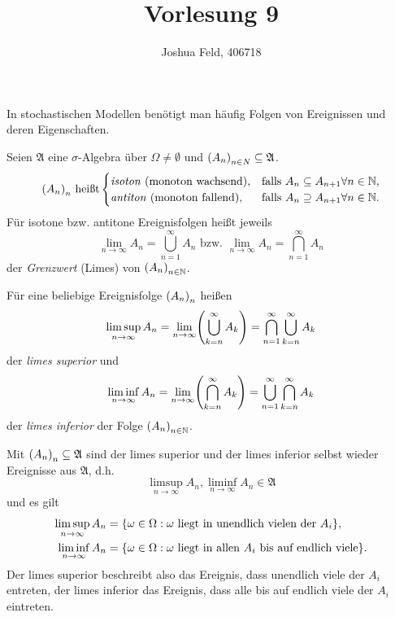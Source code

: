 \documentclass{lecture}
\institute{Institut für Statistik und Wirtschaftsmathematik}
\title{Vorlesung 9}
\author{Joshua Feld, 406718}
\begin{document}
    \maketitle


    In stochastischen Modellen benötigt man häufig Folgen von Ereignissen und deren Eigenschaften.

    \begin{definition}
        Seien \(\mathfrak{A}\) eine \(\sigma\)-Algebra über \(\Omega \ne \emptyset\) und \(\parentheses*{A_n}_{n \in N} \subseteq \mathfrak{A}\).
        \[
            \parentheses*{A_n}_n\text{ heißt}\begin{cases}
                \text{\emph{isoton} (monoton wachsend)}, & \text{falls }A_n \subseteq A_{n + 1} \forall n \in \N,\\
                \text{\emph{antiton} (monoton fallend)}, & \text{falls }A_n \supseteq A_{n + 1} \forall n \in \N.
            \end{cases}
        \]
        Für isotone bzw. antitone Ereignisfolgen heißt jeweils
        \[
            \lim_{n \to \infty}A_n = \bigcup_{n = 1}^\infty A_n\text{ bzw. }\lim_{n \to \infty}A_n = \bigcap_{n = 1}^\infty A_n
        \]
        der \emph{Grenzwert} (Limes) von \(\parentheses*{A_n}_{n \in \N}\).

        Für eine beliebige Ereignisfolge \(\parentheses*{A_n}_n\) heißen
        \[
            \limsup_{n \to \infty}A_n = \lim_{n \to \infty}\parentheses*{\bigcup_{k = n}^\infty A_k} = \bigcap_{n = 1}^\infty\bigcup_{k = n}^\infty A_k
        \]
        der \emph{limes superior} und
        \[
            \liminf_{n \to \infty}A_n = \lim_{n \to \infty}\parentheses*{\bigcap_{k = n}^\infty A_k} = \bigcup_{n = 1}^\infty\bigcap_{k = n}^\infty A_k
        \]
        der \emph{limes inferior} der Folge \(\parentheses*{A_n}_{n \in \N}\).
    \end{definition}

    \begin{remark}
        Mit \(\parentheses*{A_n}_n \subseteq \mathfrak{A}\) sind der limes superior und der limes inferior selbst wieder Ereignisse aus \(\mathfrak{A}\), d.h.
        \[
            \limsup_{n \to \infty}A_n, \liminf_{n \to \infty}A_n \in \mathfrak{A}
        \]
        und es gilt
        \begin{align*}
            \limsup_{n \to \infty}A_n &= \braces*{\omega \in \Omega : \omega\text{ liegt in unendlich vielen der }A_i},\\
            \liminf_{n \to \infty}A_n &= \braces*{\omega \in \Omega : \omega\text{ liegt in allen }A_i\text{ bis auf endlich viele}}.
        \end{align*}
        Der limes superior beschreibt also das Ereignis, dass unendlich viele der \(A_i\) entreten, der limes inferior das Ereignis, dass alle bis auf endlich viele der \(A_i\) eintreten.
    \end{remark}
\end{document}
